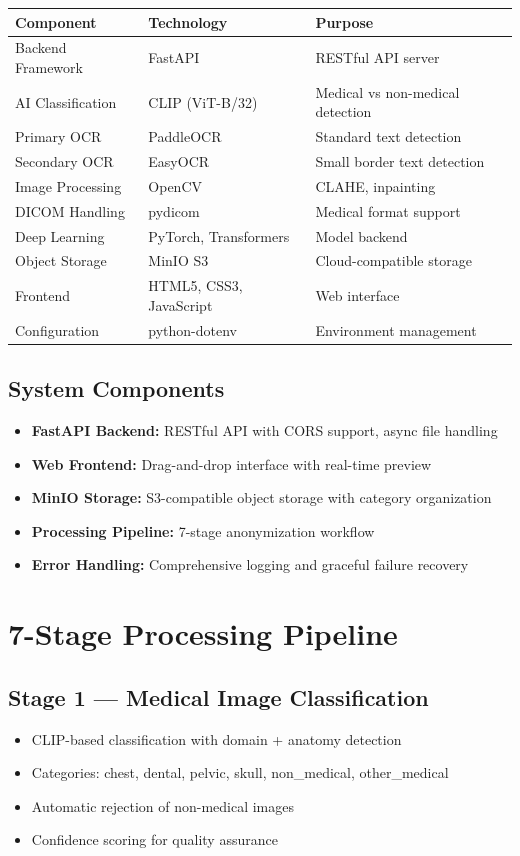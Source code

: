 \documentclass[12pt,a4paper]{article}
\begin{document}
\begin{tabular}{p{4cm} p{4cm} p{5cm}}
\toprule
\textbf{Component} & \textbf{Technology} & \textbf{Purpose} \\
\midrule
Backend Framework & FastAPI & RESTful API server \\
AI Classification & CLIP (ViT-B/32) & Medical vs non-medical detection \\
Primary OCR & PaddleOCR & Standard text detection \\
Secondary OCR & EasyOCR & Small border text detection \\
Image Processing & OpenCV & CLAHE, inpainting \\
DICOM Handling & pydicom & Medical format support \\
Deep Learning & PyTorch, Transformers & Model backend \\
Object Storage & MinIO S3 & Cloud-compatible storage \\
Frontend & HTML5, CSS3, JavaScript & Web interface \\
Configuration & python-dotenv & Environment management \\
\bottomrule
\end{tabular}

\subsection{System Components}

\begin{itemize}[leftmargin=1.2cm]
    \item \textbf{FastAPI Backend:} RESTful API with CORS support, async file handling
    \item \textbf{Web Frontend:} Drag-and-drop interface with real-time preview
    \item \textbf{MinIO Storage:} S3-compatible object storage with category organization
    \item \textbf{Processing Pipeline:} 7-stage anonymization workflow
    \item \textbf{Error Handling:} Comprehensive logging and graceful failure recovery
\end{itemize}

\section{7-Stage Processing Pipeline}

\subsection*{Stage 1 — Medical Image Classification}
\begin{itemize}[leftmargin=1.2cm]
    \item CLIP-based classification with domain + anatomy detection
    \item Categories: chest, dental, pelvic, skull, non\_medical, other\_medical
    \item Automatic rejection of non-medical images
    \item Confidence scoring for quality assurance
\end{itemize}
\end{document}
